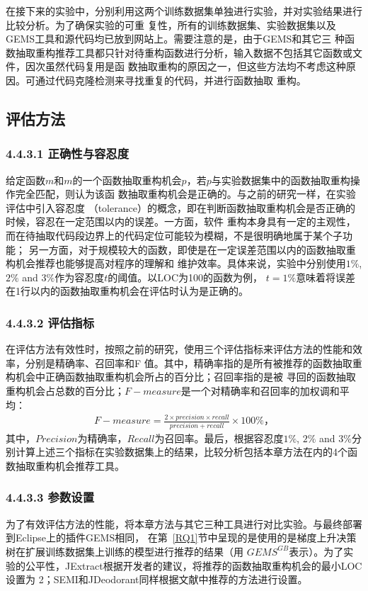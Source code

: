 在接下来的实验中，分别利用这两个训练数据集单独进行实验，并对实验结果进行比较分析。为了确保实验的可重
复性，所有的训练数据集、实验数据集以及GEMS工具和源代码均已放到网站上。需要注意的是，由于GEMS和其它三
种函数抽取重构推荐工具都只针对待重构函数进行分析，输入数据不包括其它函数或文件，因次虽然代码复用是函
数抽取重构的原因之一，但这些方法均不考虑这种原因。可通过代码克隆检测来寻找重复的代码，并进行函数抽取
重构。

\subsection{评估方法}
\subsubsection{4.4.3.1 正确性与容忍度}\label{tol}
给定函数$m$和$m$的一个函数抽取重构机会$p$，若$p$与实验数据集中的函数抽取重构操作完全匹配，则认为该函
数抽取重构机会是正确的。与之前的研究一样\cite{charalampidou2016identifying}，在实验评估中引入容忍度
（tolerance）的概念，即在判断函数抽取重构机会是否正确的时候，容忍在一定范围以内的误差。一方面，软件
重构本身具有一定的主观性，而在待抽取代码段边界上的代码定位可能较为模糊，不是很明确地属于某个子功能；
另一方面，对于规模较大的函数，即使是在一定误差范围以内的函数抽取重构机会推荐也能够提高对程序的理解和
维护效率。具体来说，实验中分别使用$1\%$, $2\%$ and $3\%$作为容忍度$t$的阈值。以LOC为100的函数为例，
$t=1\%$意味着将误差在1行以内的函数抽取重构机会在评估时认为是正确的。

\subsubsection{4.4.3.2 评估指标}
在评估方法有效性时，按照之前的研究，使用三个评估指标来评估方法的性能和效率，分别是精确率、召回率和F
值。其中，精确率指的是所有被推荐的函数抽取重构机会中正确函数抽取重构机会所占的百分比；召回率指的是被
寻回的函数抽取重构机会占总数的百分比；$F-measure$是一个对精确率和召回率的加权调和平均：
\begin{eqnarray}
  F-measure = \frac{2 \times precision \times recall}{precision + recall} \times 100\%，
\end{eqnarray}
其中，$Precision$为精确率，$Recall$为召回率。最后，根据容忍度$1\%$, $2\%$ and $3\%$分别计算上述三个指标在实验数据集上的结果，比较分析包括本章方法在内的4个函数抽取重构机会推荐工具。

\subsubsection{4.4.3.3 参数设置}
为了有效评估方法的性能，将本章方法与其它三种工具进行对比实验。与最终部署到Eclipse上的插件GEMS相同，
在第~\ref{RQ1}节中呈现的是使用的是梯度上升决策树在扩展训练数据集上训练的模型进行推荐的结果（用
$GEMS^{GB}$表示）。为了实验的公平性，JExtract根据开发者的建议，将推荐的函数抽取重构机会的最小LOC设置为
2；SEMI和JDeodorant同样根据文献中推荐的方法进行设置。

